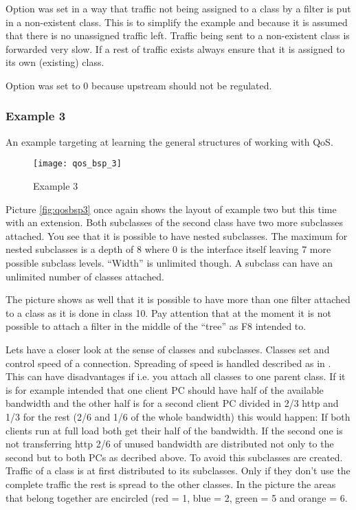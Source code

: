    Option  was set in a way that
   traffic not being assigned to a class by a filter is put in a non-existent
   class. This is to simplify the example and because it is assumed that
   there is no unassigned traffic left. Traffic being sent to a non-existent
   class is forwarded very slow. If a rest of traffic exists always ensure
   that it is assigned to its own (existing) class.

   Option  was set to 0 because upstream
   should not be regulated.



\subsubsection{Example 3}



   An example targeting at learning the general structures of working with QoS.

   \begin{figure}[htbp]
     \centering
     \texttt{[image: qos\_bsp\_3]}
     \caption{Example 3}
   \end{figure}


   Picture \ref{fig:qosbsp3} once again shows the layout of example two
   but this time with an extension. Both subclasses of the second class
   have two more subclasses attached. You see that it is possible to have
   nested subclasses. The maximum for nested subclasses is a depth of 8
   where 0 is the interface itself leaving 7 more possible subclass levels.
   ``Width'' is unlimited though. A subclass can have an unlimited number
   of classes attached.

   The picture shows as well that it is possible to have more than one filter
   attached to a class as it is done in class 10. Pay attention that at the
   moment it is not possible to attach a filter in the middle of the ``tree''
   as F8 intended to.

   Lets have a closer look at the sense of classes and subclasses. Classes
   set and control speed of a connection. Spreading of speed is handled
   described as in . This can have
   disadvantages if i.e. you attach all classes to one parent class. If it
   is for example intended that one client PC should have half of the available
   bandwidth and the other half is for a second client PC divided in 2/3 http
   and 1/3 for the rest (2/6 and 1/6 of the whole bandwidth) this would happen:
   If both clients run at full load both get their half of the bandwidth. If
   the second one is not transferring http 2/6 of unused bandwidth are
   distributed not only to the second but to both PCs as decribed above.
   To avoid this subclasses are created. Traffic of a class is at first
   distributed to its subclasses. Only if they don't use the complete
   traffic the rest is spread to the other classes. In the picture the
   areas that belong together are encircled (red = 1, blue = 2, green = 5
   and orange = 6.



